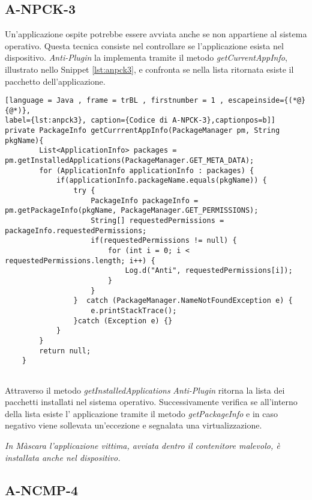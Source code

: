 \subsection*{A-NPCK-3}
\label{a-npck-3}

Un'applicazione ospite potrebbe essere avviata anche se non appartiene al sistema operativo. Questa tecnica consiste nel controllare se l'applicazione esista nel dispositivo. \emph{Anti-Plugin} la implementa tramite il metodo \emph{getCurrentAppInfo}, illustrato nello Snippet \ref{lst:anpck3}, e confronta se nella lista ritornata esiste il pacchetto dell'applicazione. 

\begin{lstlisting}[language = Java , frame = trBL , firstnumber = 1 , escapeinside={(*@}{@*)},
label={lst:anpck3}, caption={Codice di A-NPCK-3},captionpos=b]]
private PackageInfo getCurrrentAppInfo(PackageManager pm, String pkgName){
        List<ApplicationInfo> packages = pm.getInstalledApplications(PackageManager.GET_META_DATA);
        for (ApplicationInfo applicationInfo : packages) {
            if(applicationInfo.packageName.equals(pkgName)) {
                try {
                    PackageInfo packageInfo = pm.getPackageInfo(pkgName, PackageManager.GET_PERMISSIONS);
                    String[] requestedPermissions = packageInfo.requestedPermissions;
                    if(requestedPermissions != null) {
                        for (int i = 0; i < requestedPermissions.length; i++) {
                            Log.d("Anti", requestedPermissions[i]);
                        }
                    }
                }  catch (PackageManager.NameNotFoundException e) {
                    e.printStackTrace();
                }catch (Exception e) {}
            }
        }
        return null;
    }


\end{lstlisting}

Attraverso il metodo \emph{getInstalledApplications} \emph{Anti-Plugin} ritorna la lista dei pacchetti installati nel sistema operativo. Successivamente verifica se all'interno della lista esiste l' applicazione tramite il metodo \emph{getPackageInfo} e in caso negativo viene sollevata un'eccezione e segnalata una virtualizzazione.

\emph{In Màscara l'applicazione vittima, avviata dentro il contenitore malevolo, è installata anche nel dispositivo.}

\newpage

\subsection*{A-NCMP-4}
\label{a-ncmp-4}

